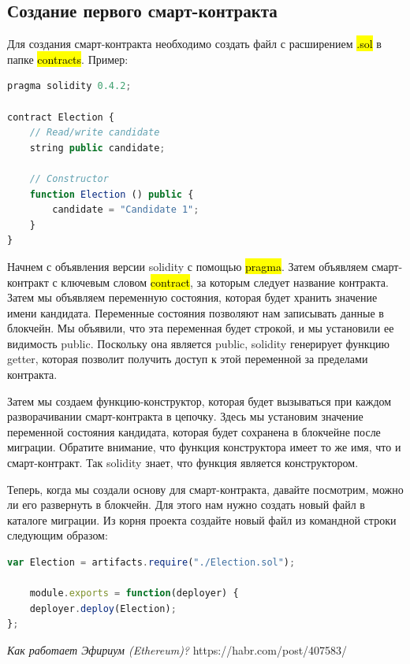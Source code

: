 \documentclass{article}
\begin{document}
\subsection{Создание первого смарт-контракта}
\medskip
Для создания смарт-контракта необходимо создать файл с расширением \hl{.sol} в папке \hl{contracts}. 
Пример:


\begin{lstlisting}[language=JavaScript, caption={contracts/Election.sol}]
pragma solidity 0.4.2;

contract Election {
	// Read/write candidate
	string public candidate;
	
	// Constructor
	function Election () public {
		candidate = "Candidate 1";
	}
}
\end{lstlisting}


Начнем с объявления версии solidity с помощью \hl{pragma}. Затем объявляем смарт-контракт с ключевым словом \hl{contract}, за которым следует название контракта. Затем мы объявляем переменную состояния, которая будет хранить значение имени кандидата. Переменные состояния позволяют нам записывать данные в блокчейн. Мы объявили, что эта переменная будет строкой, и мы установили ее видимость public. Поскольку она является public, solidity генерирует функцию getter, которая позволит получить доступ к этой переменной за пределами контракта.

Затем мы создаем функцию-конструктор, которая будет вызываться при каждом разворачивании смарт-контракта в цепочку. Здесь мы установим значение переменной состояния кандидата, которая будет сохранена в блокчейне после миграции. Обратите внимание, что функция конструктора имеет то же имя, что и смарт-контракт. Так solidity знает, что функция является конструктором.

\bigbreak

Теперь, когда мы создали основу для смарт-контракта, давайте посмотрим, можно ли его развернуть в блокчейн. Для этого нам нужно создать новый файл в каталоге миграции. Из корня проекта создайте новый файл из командной строки следующим образом:

\begin{lstlisting}[language=JavaScript, caption={contracts/Election.sol}]
var Election = artifacts.require("./Election.sol");

	module.exports = function(deployer) {
	deployer.deploy(Election);
};
\end{lstlisting}


\begin{thebibliography}{9}

	  \emph{Как работает Эфириум (Ethereum)?}
	  https://habr.com/post/407583/

\end{thebibliography}
\end{document}
